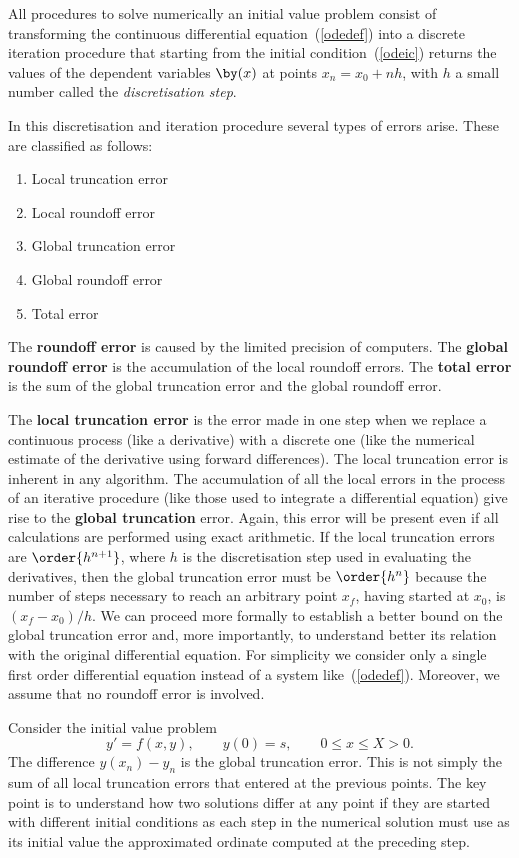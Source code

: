 All procedures to solve numerically an initial value problem consist
of transforming the continuous differential equation~(\ref{odedef})
into a discrete iteration procedure that starting from the initial
condition~(\ref{odeic}) returns the values of the dependent variables
$\by(x)$ at points $x_n = x_0 + n h$, with $h$ a small number called
the \textit{discretisation step}.

In this discretisation and iteration procedure several types of errors
arise.  These are classified as follows:
%
\begin{enumerate}
  \itemsep 0pt
\item Local truncation error
\item Local roundoff error
\item Global truncation error
\item Global roundoff error
\item Total error
\end{enumerate}
%
The \textbf{roundoff error} is caused by the limited precision of
computers.  The \textbf{global roundoff error} is the accumulation of
the local roundoff errors.  The \textbf{total error} is the sum of the
global truncation error and the global roundoff error.

The \textbf{local truncation error} is the error made in one step when
we replace a continuous process (like a derivative) with a discrete
one (like the numerical estimate of the derivative using forward
differences).  The local truncation error is inherent in any
algorithm.  The accumulation of all the local errors in the process of
an iterative procedure (like those used to integrate a differential
equation) give rise to the \textbf{global truncation} error.  Again,
this error will be present even if all calculations are performed
using exact arithmetic.  If the local truncation errors are
$\order{h^{n+1}}$, where $h$ is the discretisation step used in evaluating
the derivatives, then the global truncation error must be $\order{h^n}$
because the number of steps necessary to reach an arbitrary point
$x_f$, having started at $x_0$, is $(x_f-x_0)/h$.  We can proceed more
formally to establish a better bound on the global truncation error
and, more importantly, to understand better its relation with the
original differential equation.  For simplicity we consider only a
single first order differential equation instead of a system
like~(\ref{odedef}).  Moreover, we assume that no roundoff error is
involved.

Consider the initial value problem
%
\begin{equation}
  y'=f(x,y), \qquad y(0)=s, \qquad 0\le x\le X>0. 
  \label{IVP.eq:30}
\end{equation}
%
The difference $y(x_n)-y_n$ is the global truncation error. This is
not simply the sum of all local truncation errors that entered at the
previous points. The key point is to understand how two solutions
differ at any point if they are started with different initial
conditions as each step in the numerical solution must use as its
initial value the approximated ordinate computed at the preceding
step.

